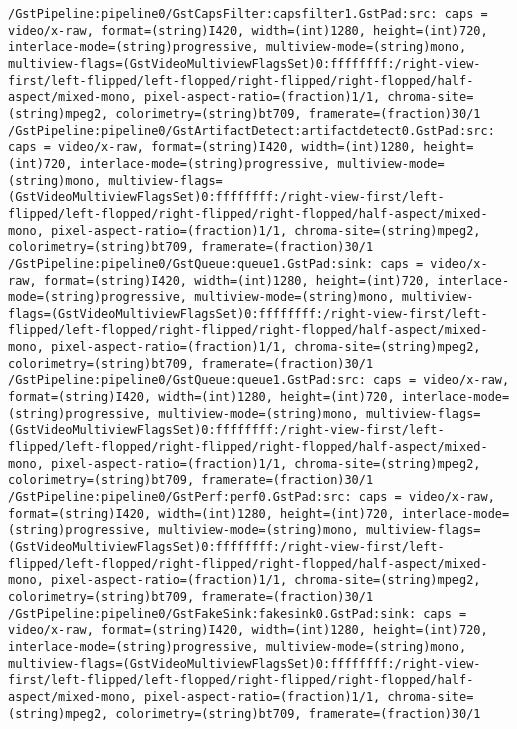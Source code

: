 \documentclass[12pt,oneside]{book}
\begin{document}
\begin{lstlisting}
/GstPipeline:pipeline0/GstCapsFilter:capsfilter1.GstPad:src: caps = video/x-raw, format=(string)I420, width=(int)1280, height=(int)720, interlace-mode=(string)progressive, multiview-mode=(string)mono, multiview-flags=(GstVideoMultiviewFlagsSet)0:ffffffff:/right-view-first/left-flipped/left-flopped/right-flipped/right-flopped/half-aspect/mixed-mono, pixel-aspect-ratio=(fraction)1/1, chroma-site=(string)mpeg2, colorimetry=(string)bt709, framerate=(fraction)30/1
/GstPipeline:pipeline0/GstArtifactDetect:artifactdetect0.GstPad:src: caps = video/x-raw, format=(string)I420, width=(int)1280, height=(int)720, interlace-mode=(string)progressive, multiview-mode=(string)mono, multiview-flags=(GstVideoMultiviewFlagsSet)0:ffffffff:/right-view-first/left-flipped/left-flopped/right-flipped/right-flopped/half-aspect/mixed-mono, pixel-aspect-ratio=(fraction)1/1, chroma-site=(string)mpeg2, colorimetry=(string)bt709, framerate=(fraction)30/1
/GstPipeline:pipeline0/GstQueue:queue1.GstPad:sink: caps = video/x-raw, format=(string)I420, width=(int)1280, height=(int)720, interlace-mode=(string)progressive, multiview-mode=(string)mono, multiview-flags=(GstVideoMultiviewFlagsSet)0:ffffffff:/right-view-first/left-flipped/left-flopped/right-flipped/right-flopped/half-aspect/mixed-mono, pixel-aspect-ratio=(fraction)1/1, chroma-site=(string)mpeg2, colorimetry=(string)bt709, framerate=(fraction)30/1
/GstPipeline:pipeline0/GstQueue:queue1.GstPad:src: caps = video/x-raw, format=(string)I420, width=(int)1280, height=(int)720, interlace-mode=(string)progressive, multiview-mode=(string)mono, multiview-flags=(GstVideoMultiviewFlagsSet)0:ffffffff:/right-view-first/left-flipped/left-flopped/right-flipped/right-flopped/half-aspect/mixed-mono, pixel-aspect-ratio=(fraction)1/1, chroma-site=(string)mpeg2, colorimetry=(string)bt709, framerate=(fraction)30/1
/GstPipeline:pipeline0/GstPerf:perf0.GstPad:src: caps = video/x-raw, format=(string)I420, width=(int)1280, height=(int)720, interlace-mode=(string)progressive, multiview-mode=(string)mono, multiview-flags=(GstVideoMultiviewFlagsSet)0:ffffffff:/right-view-first/left-flipped/left-flopped/right-flipped/right-flopped/half-aspect/mixed-mono, pixel-aspect-ratio=(fraction)1/1, chroma-site=(string)mpeg2, colorimetry=(string)bt709, framerate=(fraction)30/1
/GstPipeline:pipeline0/GstFakeSink:fakesink0.GstPad:sink: caps = video/x-raw, format=(string)I420, width=(int)1280, height=(int)720, interlace-mode=(string)progressive, multiview-mode=(string)mono, multiview-flags=(GstVideoMultiviewFlagsSet)0:ffffffff:/right-view-first/left-flipped/left-flopped/right-flipped/right-flopped/half-aspect/mixed-mono, pixel-aspect-ratio=(fraction)1/1, chroma-site=(string)mpeg2, colorimetry=(string)bt709, framerate=(fraction)30/1

\end{lstlisting}
\end{document}
